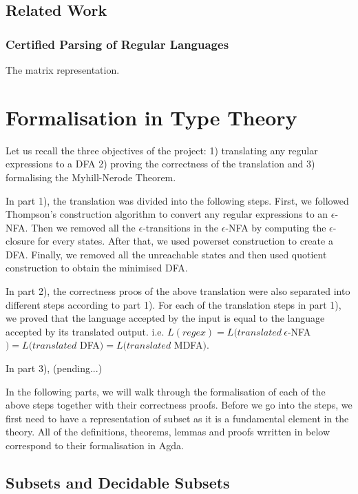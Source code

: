 \documentclass[twoside,openright,final]{bhamthesis}
\begin{document}
\subsection{Related Work}
\subsubsection{Certified Parsing of Regular Languages}
\par The matrix representation.

\newpage
\section{Formalisation in Type Theory}
\par Let us recall the three objectives of the project: 1) translating any
regular expressions to a DFA 2) proving the correctness of the translation 
and 3) formalising the Myhill-Nerode Theorem. 

\par In part 1), the translation was divided into the following steps. First, we
followed Thompson's construction algorithm to convert any regular expressions to an
\(\epsilon\)-NFA. Then we removed all the \(\epsilon\)-transitions in
the \(\epsilon\)-NFA by computing the \(\epsilon\)-closure for every states. After that, we used powerset
construction to create a DFA. Finally, we removed all the unreachable
states and then used quotient construction to obtain the minimised
DFA. 

\par In part 2), the correctness proos of the above
translation were also separated into different steps according to part
1). For each of the translation steps in part 1), we proved
that the language accepted by the input is equal to the language
accepted by its translated output. i.e. \(L(regex) =
L(translated\ \epsilon\)-NFA\() = L(translated\) DFA\() =
L(translated\) MDFA\()\). 

\par In part 3), (pending...)

\par In the following parts, we will walk through the formalisation of
each of the above steps together with their correctness proofs. Before we go into the steps, we first need to have a
representation of subset as it is a fundamental element in the
theory. All of the definitions, theorems, lemmas and proofs wrritten in below
correspond to their formalisation in Agda.

\subsection{Subsets and Decidable Subsets}
\end{document}
